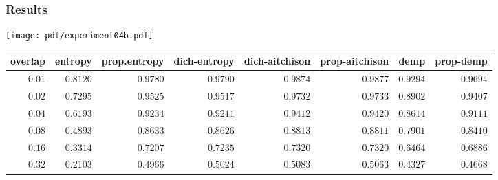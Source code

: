 \begin{frame}
\frametitle{Results}
\tiny
\begin{center}
\texttt{[image: pdf/experiment04b.pdf]}

\begin{tabular}{rrrrrrrr}
\hline\hline
\multicolumn{1}{c}{overlap}&\multicolumn{1}{c}{entropy}&\multicolumn{1}{c}{prop.entropy}&\multicolumn{1}{c}{dich-entropy}&\multicolumn{1}{c}{dich-aitchison}&\multicolumn{1}{c}{prop-aitchison}&\multicolumn{1}{c}{demp}&\multicolumn{1}{c}{prop-demp}\tabularnewline
\hline
$0.01$&$0.8120$&$0.9780$&$0.9790$&$0.9874$&$0.9877$&$0.9294$&$0.9694$\tabularnewline
$0.02$&$0.7295$&$0.9525$&$0.9517$&$0.9732$&$0.9733$&$0.8902$&$0.9407$\tabularnewline
$0.04$&$0.6193$&$0.9234$&$0.9211$&$0.9412$&$0.9420$&$0.8614$&$0.9111$\tabularnewline
$0.08$&$0.4893$&$0.8633$&$0.8626$&$0.8813$&$0.8811$&$0.7901$&$0.8410$\tabularnewline
$0.16$&$0.3314$&$0.7207$&$0.7235$&$0.7320$&$0.7320$&$0.6464$&$0.6886$\tabularnewline
$0.32$&$0.2103$&$0.4966$&$0.5024$&$0.5083$&$0.5063$&$0.4327$&$0.4668$\tabularnewline
\hline
\end{tabular}\end{center}
\end{frame}